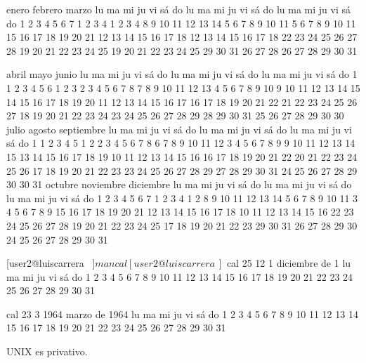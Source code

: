 \documentclass{memoir}
\begin{document}
        enero                 febrero                 marzo
lu ma mi ju vi sá do   lu ma mi ju vi sá do   lu ma mi ju vi sá do
 1  2  3  4  5  6  7             1  2  3  4             1  2  3  4
 8  9 10 11 12 13 14    5  6  7  8  9 10 11    5  6  7  8  9 10 11
15 16 17 18 19 20 21   12 13 14 15 16 17 18   12 13 14 15 16 17 18
22 23 24 25 26 27 28   19 20 21 22 23 24 25   19 20 21 22 23 24 25
29 30 31               26 27 28               26 27 28 29 30 31

        abril                  mayo                   junio
lu ma mi ju vi sá do   lu ma mi ju vi sá do   lu ma mi ju vi sá do
                   1       1  2  3  4  5  6                1  2  3
 2  3  4  5  6  7  8    7  8  9 10 11 12 13    4  5  6  7  8  9 10
 9 10 11 12 13 14 15   14 15 16 17 18 19 20   11 12 13 14 15 16 17
16 17 18 19 20 21 22   21 22 23 24 25 26 27   18 19 20 21 22 23 24
23 24 25 26 27 28 29   28 29 30 31            25 26 27 28 29 30
30
        julio                 agosto               septiembre
lu ma mi ju vi sá do   lu ma mi ju vi sá do   lu ma mi ju vi sá do
                   1          1  2  3  4  5                   1  2
 2  3  4  5  6  7  8    6  7  8  9 10 11 12    3  4  5  6  7  8  9
 9 10 11 12 13 14 15   13 14 15 16 17 18 19   10 11 12 13 14 15 16
16 17 18 19 20 21 22   20 21 22 23 24 25 26   17 18 19 20 21 22 23
23 24 25 26 27 28 29   27 28 29 30 31         24 25 26 27 28 29 30
30 31
       octubre               noviembre              diciembre
lu ma mi ju vi sá do   lu ma mi ju vi sá do   lu ma mi ju vi sá do
 1  2  3  4  5  6  7             1  2  3  4                   1  2
 8  9 10 11 12 13 14    5  6  7  8  9 10 11    3  4  5  6  7  8  9
15 16 17 18 19 20 21   12 13 14 15 16 17 18   10 11 12 13 14 15 16
22 23 24 25 26 27 28   19 20 21 22 23 24 25   17 18 19 20 21 22 23
29 30 31               26 27 28 29 30         24 25 26 27 28 29 30
                                              31

[user2@luiscarrera ~]$


 man cal
[user2@luiscarrera ~]$ cal 25 12 1
   diciembre de 1
lu ma mi ju vi sá do
          1  2  3  4
 5  6  7  8  9 10 11
12 13 14 15 16 17 18
19 20 21 22 23 24 25
26 27 28 29 30 31


cal 23 3 1964
    marzo de 1964
lu ma mi ju vi sá do
                   1
 2  3  4  5  6  7  8
 9 10 11 12 13 14 15
16 17 18 19 20 21 22
23 24 25 26 27 28 29
30 31



UNIX es privativo.
\end{document}
